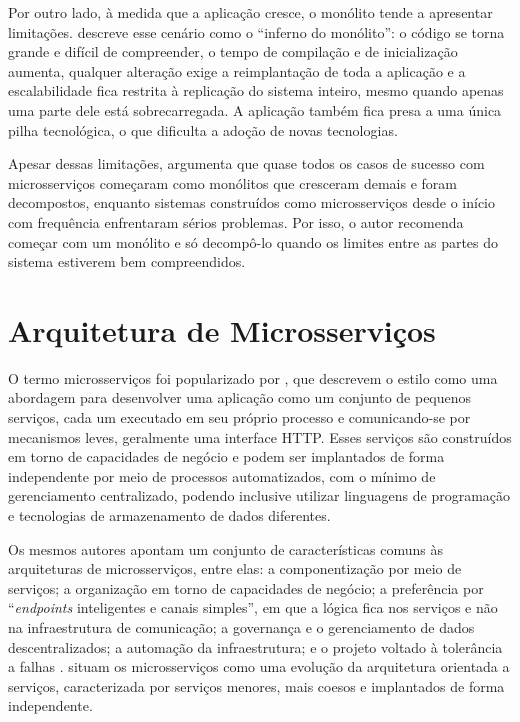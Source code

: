 Por outro lado, à medida que a aplicação cresce, o monólito tende a apresentar limitações.
 descreve esse cenário como o ``inferno do monólito'': o código se
torna grande e difícil de compreender, o tempo de compilação e de inicialização aumenta,
qualquer alteração exige a reimplantação de toda a aplicação e a escalabilidade fica restrita
à replicação do sistema inteiro, mesmo quando apenas uma parte dele está sobrecarregada. A
aplicação também fica presa a uma única pilha tecnológica, o que dificulta a adoção de novas
tecnologias.

Apesar dessas limitações,  argumenta que quase todos os casos de
sucesso com microsserviços começaram como monólitos que cresceram demais e foram
decompostos, enquanto sistemas construídos como microsserviços desde o início com frequência
enfrentaram sérios problemas. Por isso, o autor recomenda começar com um monólito e só
decompô-lo quando os limites entre as partes do sistema estiverem bem compreendidos.

\section{Arquitetura de Microsserviços}

O termo microsserviços foi popularizado por , que descrevem o estilo como
uma abordagem para desenvolver uma aplicação como um conjunto de pequenos serviços, cada um
executado em seu próprio processo e comunicando-se por mecanismos leves, geralmente uma
interface HTTP. Esses serviços são construídos em torno de capacidades de negócio e podem ser
implantados de forma independente por meio de processos automatizados, com o mínimo de
gerenciamento centralizado, podendo inclusive utilizar linguagens de programação e tecnologias
de armazenamento de dados diferentes.

Os mesmos autores apontam um conjunto de características comuns às arquiteturas de
microsserviços, entre elas: a componentização por meio de serviços; a organização em torno de
capacidades de negócio; a preferência por ``\textit{endpoints} inteligentes e canais simples'',
em que a lógica fica nos serviços e não na infraestrutura de comunicação; a governança e o
gerenciamento de dados descentralizados; a automação da infraestrutura; e o projeto voltado à
tolerância a falhas \cite{lewis2014}.  situam os microsserviços como
uma evolução da arquitetura orientada a serviços, caracterizada por serviços menores, mais
coesos e implantados de forma independente.

